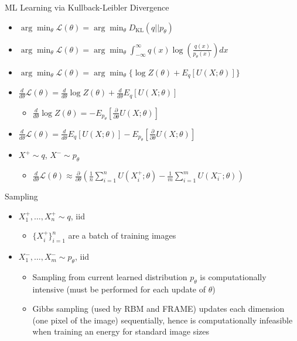 \documentclass{beamer}
\begin{document}
\begin{frame}{ML Learning via Kullback-Leibler Divergence}
\begin{itemize}
\item $\arg\min_\theta\mathcal{L}(\theta)=\arg\min_\theta D_\text{KL}(q||p_\theta)$
\item $\arg\min_\theta\mathcal{L}(\theta)=\arg\min_\theta \int_{-\infty}^\infty q(x)\log(\frac{q(x)}{p_\theta(x)})dx$
\item $\arg\min_\theta\mathcal{L}(\theta)=\arg\min_\theta \{\log Z(\theta)+E_q[U(X;\theta)]\}$
\item $\frac{d}{d\theta}\mathcal{L}(\theta)=\frac{d}{d\theta}\log Z(\theta)+\frac{d}{d\theta}E_q[U(X;\theta)]$\begin{itemize}
\item $\frac{d}{d\theta}\log Z(\theta)=-E_{p_\theta}[\frac{\partial}{\partial\theta}U(X;\theta)]$\end{itemize}
\item $\frac{d}{d\theta}\mathcal{L}(\theta)=\frac{d}{d\theta}E_q[U(X;\theta)]-E_{p_\theta}[\frac{\partial}{\partial\theta}U(X;\theta)]$
\item $X^+\sim q$, $X^-\sim p_\theta$\begin{itemize}
\item $\frac{d}{d\theta}\mathcal{L}(\theta)\approx\frac{\partial}{\partial\theta}(\frac{1}{n}\sum_{i=1}^n U(X_i^+;\theta)-\frac{1}{m}\sum_{i=1}^m U(X_i^-;\theta))$\end{itemize}
\end{itemize}
\end{frame}
\begin{frame}{Sampling}
\begin{itemize}
\item $X_1^+,\dots,X_n^+\sim q$, iid
\begin{itemize}
\item $\{X_i^+\}_{i=1}^n$ are a batch of training images
\end{itemize}
\item $X_1^-,\dots,X_m^-\sim p_\theta$, iid
\begin{itemize}
\item Sampling from current learned distribution $p_\theta$ is computationally intensive (must be performed for each update of $\theta$)
\item Gibbs sampling (used by RBM and FRAME) updates each dimension (one pixel of the image) sequentially, hence is computationally infeasible when training an energy for standard image sizes
\end{itemize}
\end{itemize}
\end{frame}
\end{document}
